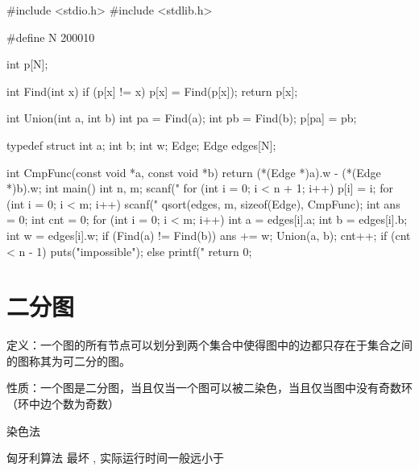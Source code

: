 \begin{mycpptwocol}[Kruskal 算法]
    #include <stdio.h>
    #include <stdlib.h>

    #define N 200010

    int p[N];

    int Find(int x) {
        if (p[x] != x) {
            p[x] = Find(p[x]);
        }
        return p[x];
    }

    int Union(int a, int b) {
        int pa = Find(a);
        int pb = Find(b);
        p[pa] = pb;
    }

    typedef struct {
        int a;
        int b;
        int w;
    } Edge;
    Edge edges[N];

    int CmpFunc(const void *a, const void *b) {
        return (*(Edge *)a).w - (*(Edge *)b).w;
    }
    int main() {
        int n, m;
        scanf("%
        for (int i = 0; i < n + 1; i++) {
            p[i] = i;
        }
        for (int i = 0; i < m; i++) {
            scanf("%
        }
        qsort(edges, m, sizeof(Edge), CmpFunc);
        int ans = 0;
        int cnt = 0;
        for (int i = 0; i < m; i++) {
            int a = edges[i].a;
            int b = edges[i].b;
            int w = edges[i].w;
            if (Find(a) != Find(b)) {
                ans += w;
                Union(a, b);
                cnt++;
            }
        }
        if (cnt < n - 1) {
            puts("impossible");
        } else {
            printf("%
        }
        return 0;
    }
\end{mycpptwocol}


\section{二分图}

定义：一个图的所有节点可以划分到两个集合中使得图中的边都只存在于集合之间的图称其为可二分的图。

性质：一个图是二分图，当且仅当一个图可以被二染色，当且仅当图中没有奇数环（环中边个数为奇数）

\begin{myenum}
    \item 染色法 
    \item 匈牙利算法 最坏 , 实际运行时间一般远小于 
\end{myenum}

